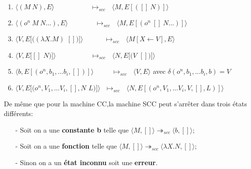 \documentclass[10pt,a4paper]{report}
\begin{document}
	\begin{enumerate}
		\item $\langle(M~N),E\rangle~~~~~~~~~~~~~~~~~~~~~~~~\longmapsto_{scc}~~~\langle M,E[([]~N)]\rangle$
		
		\item $\langle(o^{n}~M~N...),E\rangle~~~~~~~~~~~~~~~~~~\longmapsto_{scc}~~~\langle M,E[(o^{n}~[]~N...)]\rangle$
		
		\item $\langle V,E[((\lambda X.M)$ $[])]\rangle~~~~~~~~~~~~~~\longmapsto_{scc}~~~\langle M[X\leftarrow V],E\rangle$
		
		\item $\langle V,E[[]$ $N)]\rangle~~~~~~~~~~~~~~~~~~~~~~~\longmapsto_{scc}~~~\langle N,E[(V$ $[])]\rangle$
		
		\item $\langle b,E[(o^{n},b_{1},...b_{i},[])]\rangle~~~~~~~~~~~~\longmapsto_{scc}~~~\langle V,E\rangle$ avec $\delta
		(o^{n},b_{1},...b_{i},b)=V$ 
		
		\item $\langle V,E[(o^{n},V_{1},...V_{i},[],N$ $L)]\rangle~~~\longmapsto_{scc}~~~\langle N,E[(o^{n},V_{1},...V_{i},V,[],L)]\rangle$
	\end{enumerate}
	\bigbreak
	
	
	De même que pour la machine CC,la machine SCC peut s'arrêter dans trois états différents:
	\begin{itemize}
		\item[-] Soit on a une \textbf{constante b} telle que $\langle M,[]\rangle \twoheadrightarrow_{scc} \langle b,[]\rangle$;
		\item[-] Soit on a une \textbf{fonction} telle que $\langle M,[]\rangle \twoheadrightarrow_{scc} \langle\lambda X.N,[]\rangle$;
		\item[-] Sinon on a un \textbf{état inconnu} soit une \textbf{erreur}.
	\end{itemize}
	\bigbreak
	
\end{document}
